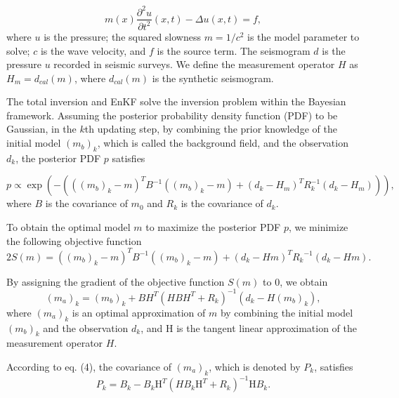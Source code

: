 \documentclass[mreferee]{gji}
\begin{document}
\begin{equation}
m(x)\frac{\partial ^2{u}}{\partial{t^2}}(x,t)-\Delta u(x,t)=f,
\end{equation}
where $u$ is the pressure; the squared slowness $m=1/c^2$ is the model parameter to solve; $c$ is the wave velocity, and $f$ is the source term. The seismogram $d$ is the pressure $u$ recorded in seismic surveys. We define the measurement operator $H$ as $H_m=d_{cal}(m)$, where $d_{cal}(m)$ is the synthetic seismogram.

The total inversion and EnKF solve the inversion problem within the Bayesian framework. Assuming the posterior probability density function (PDF) to be Gaussian, in the $k$th updating step, by combining the prior knowledge of the initial model $(m_b)_k$, which is called the background field, and the observation $d_k$, the posterior PDF $p$ satisfies


\begin{equation}
p \varpropto \exp\left ( -\left ( \left ( \left ( m_b \right )_k - m \right )^T B^{-1} \left ( \left ( m_b \right )_k -m\right ) +\left ( d_k-H_m \right )^TR_k^{-1}\left ( d_k-H_m \right )\right ) \right ),
\end{equation}
where $B$ is the covariance of $m_0$ and $R_k$ is the covariance of $d_k$.

To obtain the optimal model $m$ to maximize the posterior PDF $p$, we minimize the following objective function 
\begin{equation}
2S\left(m\right)=\left(\left(m_b\right)_k-m\right)^TB^{-1}\left(\left(m_b\right)_k-m\right)+\left(d_k-Hm\right)^T{R_k}^{-1}\left(d_k-Hm\right).
\end{equation}

By assigning the gradient of the objective function $S(m)$ to 0, we obtain
\begin{equation}
(m_a)_k=(m_b)_k+BH^T(HBH^T+R_k)^{-1}(d_k-H(m_b)_k),
\end{equation}
where $(m_a)_k$ is an optimal approximation of $m$ by combining the initial model $(m_b)_k$ and the observation $d_k$, and H is the tangent linear approximation of the measurement operator $H$.

According to eq. (4), the covariance of $(m_a)_k$, which is denoted by $P_k$, satisfies
\begin{equation}
P_k=B_k-B_k\mbox{H}^T(HB_k\mbox{H}^T+R_k)^{-1}\mbox{H}B_k.
\end{equation}
\end{document}
